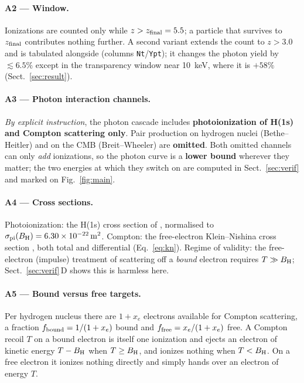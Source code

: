 \documentclass[11pt,a4paper]{article}
\begin{document}
\paragraph{A2 --- Window.}
Ionizations are counted only while $z > z_{\rm final} = 5.5$; a particle that
survives to $z_{\rm final}$ contributes nothing further. A second variant
extends the count to $z>3.0$ and is tabulated alongside (columns
\texttt{Nt}/\texttt{Ypt}); it changes the photon yield by
$\lesssim 6.5\%$ except in the transparency window near
\SI{10}{\kilo\electronvolt}, where it is $+58\%$ (Sect.~\ref{sec:result}).

\paragraph{A3 --- Photon interaction channels.}
\emph{By explicit instruction}, the photon cascade includes
\textbf{photoionization of H(1s) and Compton scattering only}. Pair production
on hydrogen nuclei (Bethe--Heitler) and on the CMB (Breit--Wheeler) are
\textbf{omitted}. Both omitted channels can only \emph{add} ionizations, so
the photon curve is a \textbf{lower bound} wherever they matter; the two
energies at which they switch on are computed in
Sect.~\ref{sec:verif} and marked on Fig.~\ref{fig:main}.

\paragraph{A4 --- Cross sections.}
Photoionization: the H(1s) cross section of \citet{karzas61}, normalised to
$\sigma_{\rm pi}(B_{\rm H}) = \SI{6.30e-22}{\metre\squared}$. Compton: the
free-electron Klein--Nishina cross section \citep{klein29}, both total and
differential (Eq.~\ref{eq:kn}). Regime of validity: the free-electron
(impulse) treatment of scattering off a \emph{bound} electron requires
$T \gg B_{\rm H}$; Sect.~\ref{sec:verif}\,D shows this is harmless here.

\paragraph{A5 --- Bound versus free targets.}
Per hydrogen nucleus there are $1+x_e$ electrons available for Compton
scattering, a fraction $f_{\rm bound} = 1/(1+x_e)$ bound and
$f_{\rm free} = x_e/(1+x_e)$ free. A Compton recoil $T$ on a bound electron
is itself one ionization and ejects an electron of kinetic energy $T-B_{\rm H}$
when $T \ge B_{\rm H}$, and ionizes nothing when $T<B_{\rm H}$. On a free
electron it ionizes nothing directly and simply hands over an electron of
energy $T$.
\end{document}
